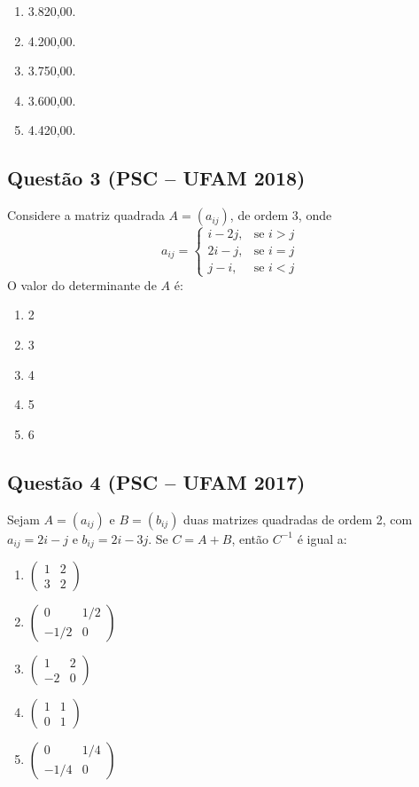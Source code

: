 \documentclass{article}
\begin{document}
\begin{multicols}{2}
		\begin{enumerate}[label=(\Alph*), noitemsep]
			\item 3.820,00.
			\item 4.200,00.
			\item 3.750,00.
			\item 3.600,00.
			\item 4.420,00.
		\end{enumerate}
		
		\subsection*{Questão 3 (PSC – UFAM 2018)}
		Considere a matriz quadrada \( A = (a_{ij}) \), de ordem 3, onde
		\[
		a_{ij} = \begin{cases} 
			i - 2j, & \text{se } i > j \\
			2i - j, & \text{se } i = j \\
			j - i, & \text{se } i < j 
		\end{cases}
		\]
		O valor do determinante de \( A \) é:
		
		\begin{enumerate}[label=(\Alph*), noitemsep]
			\item 2
			\item 3
			\item 4
			\item 5
			\item 6
		\end{enumerate}
		
		\subsection*{Questão 4 (PSC – UFAM 2017)}
		Sejam \( A = (a_{ij}) \) e \( B = (b_{ij}) \) duas matrizes quadradas de ordem 2, com \( a_{ij} = 2i - j \) e \( b_{ij} = 2i - 3j \). Se \( C = A + B \), então \( C^{-1} \) é igual a:
		
		\begin{enumerate}[label=(\Alph*), noitemsep]
			\item \(\begin{pmatrix} 1 & 2 \\ 3 & 2 \end{pmatrix}\)
			\item \(\begin{pmatrix} 0 & 1/2 \\ -1/2 & 0 \end{pmatrix}\)
			\item \(\begin{pmatrix} 1 & 2 \\ -2 & 0 \end{pmatrix}\)
			\item \(\begin{pmatrix} 1 & 1 \\ 0 & 1 \end{pmatrix}\)
			\item \(\begin{pmatrix} 0 & 1/4 \\ -1/4 & 0 \end{pmatrix}\)
		\end{enumerate}
		

\end{multicols}
\end{document}
